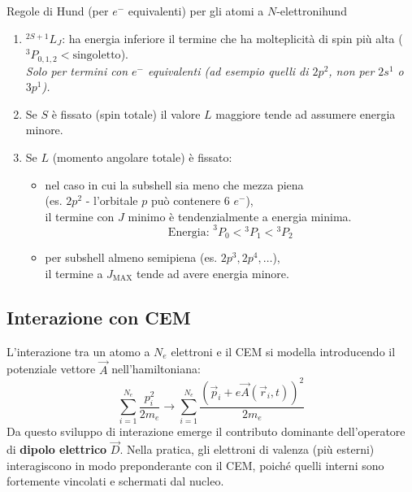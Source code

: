 \begin{note}{Regole di Hund (per \(e^-\) equivalenti) per gli atomi a \(N\)-elettroni}{hund}
\begin{enumerate}
    \item \(^{2S+1}L_J\): ha energia inferiore il termine che ha molteplicità di spin più alta (\(^3P_{0,1,2} < \text{singoletto}\)). \\
    \textit{Solo per termini con \(e^-\) equivalenti (ad esempio quelli di \(2p^2\), non per \(2s^1\) o \(3p^1\)).} 

    \item Se \(S\) è fissato (spin totale) il valore \(L\) maggiore tende ad assumere energia minore.

    \item Se \(L\) (momento angolare totale) è fissato:
    \begin{itemize}
        \item nel caso in cui la subshell sia meno che mezza piena \\
        (es. \(2p^2\) - l'orbitale \(p\) può contenere 6 \(e^-\)), \\
        il termine con \(J\) minimo è tendenzialmente a energia minima.
        \begin{equation}
            \text{Energia: } ^3P_0 < {^3P_1} < {^3P_2}
        \end{equation}
        \item per subshell almeno semipiena
        (es. \(2p^3, 2p^4, \dots\)), \\
        il termine a \(J_{\text{MAX}}\) tende ad avere energia minore.
    \end{itemize}
\end{enumerate}

\end{note} 

\subsection{Interazione con CEM}

L'interazione tra un atomo a \(N_e\) elettroni e il CEM si modella introducendo il potenziale vettore \(\vec{A}\) nell'hamiltoniana:
\begin{equation}
    \sum_{i=1}^{N_e} \frac{p_i^2}{2m_e} \longrightarrow \sum_{i=1}^{N_e} \frac{(\vec{p}_i + e\vec{A}(\vec{r}_i, t))^2}{2m_e}
\end{equation}
Da questo sviluppo di interazione emerge il contributo dominante dell'operatore di \textbf{dipolo elettrico} \(\vec{D}\). 
Nella pratica, gli elettroni di valenza (più esterni) interagiscono in modo preponderante con il CEM, poiché quelli interni sono fortemente vincolati e schermati dal nucleo.

